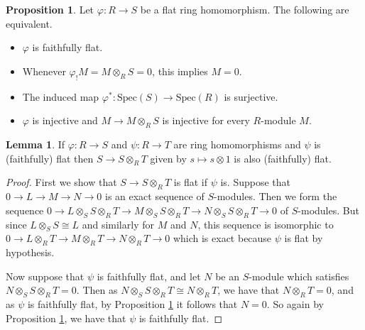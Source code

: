 \documentclass[oneside,11pt]{amsart}
\newcommand{\Spec}{\ensuremath{\text{Spec}}}
\theoremstyle{definition}
\newtheorem{proof techniques}{Proof Techniques}
\newtheorem{lemma}{Lemma}
\newtheorem{proposition}{Proposition}
\begin{document}
\begin{proposition}\label{prop: equivalent characterizations of faithful flatness}
Let $\varphi : R \to S$ be a flat ring homomorphism. The following are equivalent. 
\begin{itemize}

\item $\varphi$ is faithfully flat.

\item Whenever $\varphi_! M = M \otimes_R S = 0$, this implies $M = 0$.

\item The induced map $\varphi^* : \Spec(S) \to \Spec(R)$ is surjective. 

\item $\varphi$ is injective and $M \to M \otimes_R S$ is injective for every $R$-module $M$. 

\end{itemize}
\end{proposition}


\begin{lemma}\label{lem: flatness is preserved by pushouts}
If $\varphi : R \to S$ and $\psi : R \to T$ are ring homomorphisms and $\psi$ is (faithfully) flat then $S \to S \otimes_R T$ given by $s \mapsto s \otimes 1$ is also (faithfully) flat. 
\end{lemma}

\begin{proof}
First we show that $S \to S \otimes_R T$ is flat if $\psi$ is. Suppose that $0 \to L \to M \to N \to 0$ is an exact sequence of $S$-modules. Then we form the sequence $0 \to L \otimes_S S \otimes_R T \to M \otimes_S S \otimes_R T  \to N \otimes_S S \otimes_R T \to 0$ of $S$-modules. But since $L \otimes_S S \cong L$ and similarly for $M$ and $N$, this sequence is isomorphic to $0 \to L \otimes_R T \to M \otimes_R T  \to N \otimes_R T \to 0$ which is exact because $\psi$ is flat by hypothesis. 

Now suppose that $\psi$ is faithfully flat, and let $N$ be an $S$-module which satisfies $N \otimes_S S \otimes_R T = 0$. Then as $N \otimes_S S \otimes_R T \cong N \otimes_R T$, we have that $N \otimes_R T = 0$, and as $\psi$ is faithfully flat, by Proposition \ref{prop: equivalent characterizations of faithful flatness} it follows that $N = 0$. So again by Proposition \ref{prop: equivalent characterizations of faithful flatness}, we have that $\psi$ is faithfully flat. 
\end{proof}
\end{document}
